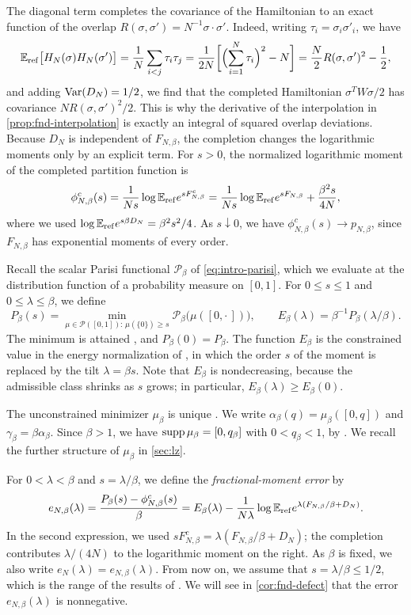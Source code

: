 The diagonal term completes the covariance of the Hamiltonian to an
exact function of the overlap $R(\sigma,\sigma')=N^{-1}\sigma\cdot\sigma'$.
Indeed, writing $\tau_i=\sigma_i\sigma'_i$, we have
\[
 \mathbb E_{\rm ref}\bigl[H_N(\sigma)H_N(\sigma')\bigr]
 =\frac1N\sum_{i<j}\tau_i\tau_j
 =\frac1{2N}\biggl[\Bigl(\sum_{i=1}^N\tau_i\Bigr)^2-N\biggr]
 =\frac N2R(\sigma,\sigma')^2-\frac12 ,
\]
and adding $\operatorname{Var}(D_N)=1/2$, we find that the completed Hamiltonian
$\sigma^TW\sigma/2$ has covariance $NR(\sigma,\sigma')^2/2$. This is why
the derivative of the interpolation in \cref{prop:fnd-interpolation} is
exactly an integral of squared overlap deviations. Because $D_N$ is
independent of $F_{N,\beta}$, the completion changes the logarithmic
moments only by an explicit term. For $s>0$, the normalized logarithmic moment of the completed
partition function is \cite[(1.3)]{AL}
\[
 \phi^c_{N,\beta}(s)
   =\frac1{Ns}\log\mathbb E_{\rm ref}e^{sF^c_{N,\beta}}
   =\frac1{Ns}\log\mathbb E_{\rm ref}e^{sF_{N,\beta}}+\frac{\beta^2s}{4N},
\]
where we used $\log\mathbb E_{\rm ref}e^{s\beta D_N}=\beta^2s^2/4$. As $s\downarrow0$, we have $\phi^c_{N,\beta}(s)\to p_{N,\beta}$, since
$F_{N,\beta}$ has exponential moments of every order.

Recall the scalar Parisi functional $\mathcal P_\beta$ of
\eqref{eq:intro-parisi}, which we evaluate at the distribution function
of a probability measure on $[0,1]$. For $0\le s\le1$ and
$0\le\lambda\le\beta$, we define
\[
 P_\beta(s)=\min_{\mu\in\mathcal P([0,1]):\,\mu(\{0\})\ge s}
      \mathcal P_\beta\bigl(\mu([0,\cdot\,])\bigr),
 \qquad E_\beta(\lambda)=\beta^{-1}P_\beta(\lambda/\beta).
\]
The minimum is attained \cite[Section~1.1]{AL}, and $P_\beta(0)=P_\beta$.
The function $E_\beta$ is the constrained value in the energy
normalization of \cite[Section~7.1]{AL}, in which the order $s$ of the
moment is replaced by the tilt $\lambda=\beta s$. Note that $E_\beta$ is nondecreasing, because the admissible class
shrinks as $s$ grows; in particular, $E_\beta(\lambda)\ge E_\beta(0)$.

The unconstrained minimizer $\mu_\beta$ is unique
\cite{AuffingerChen2015Uniqueness}. We write
$\alpha_\beta(q)=\mu_\beta([0,q])$ and $\gamma_\beta=\beta\alpha_\beta$.
Since $\beta>1$, we have $\operatorname{supp}\mu_\beta=[0,q_\beta]$ with
$0<q_\beta<1$, by \cite[Theorem~1.1]{Lopatto}. We recall the further
structure of $\mu_\beta$ in \cref{sec:lz}.

For $0<\lambda<\beta$ and $s=\lambda/\beta$, we define the
\emph{fractional-moment error} by
\begin{equation}\label{eq:fnd-error-definition}
 e_{N,\beta}(\lambda)
    =\frac{P_\beta(s)-\phi^c_{N,\beta}(s)}\beta
    =E_\beta(\lambda)
       -\frac1{N\lambda}\log\mathbb E_{\rm ref}
          e^{\lambda(F_{N,\beta}/\beta+D_N)} .
\end{equation}
In the second expression, we used
$sF^c_{N,\beta}=\lambda(F_{N,\beta}/\beta+D_N)$; the completion
contributes $\lambda/(4N)$ to the logarithmic moment on the right.
As $\beta$ is fixed, we also write $e_N(\lambda)=e_{N,\beta}(\lambda)$.
From now on, we assume that $s=\lambda/\beta\le1/2$, which is the range
of the results of \cite[Section~2]{AL}. We will see in
\cref{cor:fnd-defect} that the error
$e_{N,\beta}(\lambda)$ is nonnegative.

